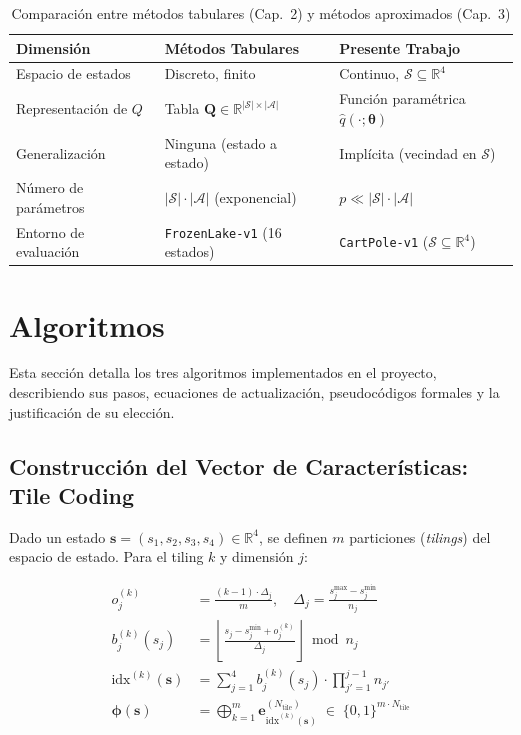 \begin{table}[htb!]
\caption{Comparación entre métodos tabulares (Cap.~2) y métodos aproximados (Cap.~3)}\label{tab:diff}
\centering\small
\begin{tabular}{@{}lll@{}}
\toprule
\textbf{Dimensión} & \textbf{Métodos Tabulares} & \textbf{Presente Trabajo} \\
\midrule
Espacio de estados & Discreto, finito & Continuo, $\mathcal{S} \subseteq \mathbb{R}^4$ \\
Representación de $Q$ & Tabla $\mathbf{Q} \in \mathbb{R}^{|\mathcal{S}|\times|\mathcal{A}|}$ & Función paramétrica $\hat{q}(\cdot;\boldsymbol{\theta})$ \\
Generalización & Ninguna (estado a estado) & Implícita (vecindad en $\mathcal{S}$) \\
Número de parámetros & $|\mathcal{S}| \cdot |\mathcal{A}|$ (exponencial) & $p \ll |\mathcal{S}| \cdot |\mathcal{A}|$ \\
Entorno de evaluación & \texttt{FrozenLake-v1} (16 estados) & \texttt{CartPole-v1} ($\mathcal{S} \subseteq \mathbb{R}^4$) \\
\bottomrule
\end{tabular}
\end{table}

\section{Algoritmos}

Esta sección detalla los tres algoritmos implementados en el proyecto, describiendo sus pasos, ecuaciones de actualización, pseudocódigos formales y la justificación de su elección.

\subsection{Construcción del Vector de Características: Tile Coding}

Dado un estado $\mathbf{s} = (s_1, s_2, s_3, s_4) \in \mathbb{R}^4$, se definen $m$ particiones (\textit{tilings}) del espacio de estado. Para el tiling $k$ y dimensión $j$:

\begin{align}
  o_j^{(k)} &= \frac{(k-1) \cdot \Delta_j}{m}, \quad \Delta_j = \frac{s_j^{\max} - s_j^{\min}}{n_j} \\[4pt]
  b_j^{(k)}(s_j) &= \left\lfloor \frac{s_j - s_j^{\min} + o_j^{(k)}}{\Delta_j} \right\rfloor \bmod n_j \\[4pt]
  \text{idx}^{(k)}(\mathbf{s}) &= \sum_{j=1}^{4} b_j^{(k)}(s_j) \cdot \prod_{j'=1}^{j-1} n_{j'} \\[4pt]
  \boldsymbol{\phi}(\mathbf{s}) &= \bigoplus_{k=1}^{m} \mathbf{e}_{\text{idx}^{(k)}(\mathbf{s})}^{(N_{\text{tile}})} \;\in\; \{0,1\}^{m \cdot N_{\text{tile}}}
\end{align}

